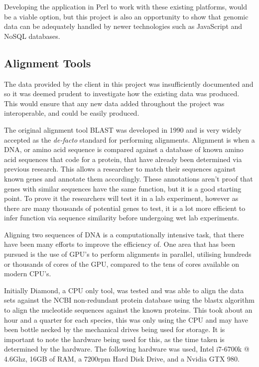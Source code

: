 Developing the application in Perl to work with these existing platforms, would be a viable option, but this project is also an opportunity to show that genomic data can be adequately handled by newer technologies such as JavaScript and NoSQL databases.

\subsection{Alignment Tools}
The data provided by the client in this project was insufficiently documented and so it was deemed prudent to investigate how the existing data was produced. This would ensure that any new data added throughout the project was interoperable, and could be easily produced.

The original alignment tool BLAST\cite{blast} was developed in 1990 and is very widely accepted as the {\it de-facto} standard for performing alignments. 
Alignment is when a DNA, or amino acid sequence is compared against a database of known amino acid sequences that code for a protein, that have already been determined via previous research. This allows a researcher to match their sequences against known genes and annotate them accordingly. These annotations aren't proof that genes with similar sequences have the same function, but it is a good starting point. To prove it the researchers will test it in a lab experiment, however as there are many thousands of potential genes to test, it is a lot more efficient to infer function via sequence similarity before undergoing wet lab experiments.

Aligning two sequences of DNA is a computationally intensive task, that there have been many efforts to improve the efficiency of. One area that has been pursued is the use of GPU's to perform alignments in parallel, utilising hundreds or thousands of cores of the GPU, compared to the tens of cores available on modern CPU's. 

Initially Diamond\cite{diamond}, a CPU only tool, was tested and was able to align the data sets against the NCBI\cite{ncbi} non-redundant protein database\cite{nr} using the blastx algorithm to align the nucleotide sequences against the known proteins. This took about an hour and a quarter for each species, this was only using the CPU and may have been bottle necked by the mechanical drives being used for storage. It is important to note the hardware being used for this, as the time taken is determined by the hardware. The following hardware was used, Intel i7-6700k @ 4.6Ghz, 16GB of RAM, a 7200rpm Hard Disk Drive, and a Nvidia GTX 980. 

